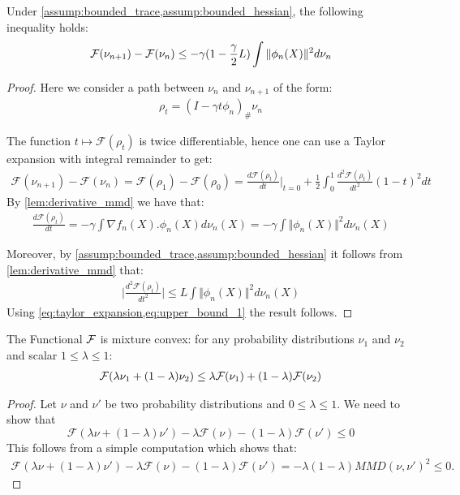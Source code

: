 \begin{lemma}\label{lem:decreasing_functional}
	Under \cref{assump:bounded_trace,assump:bounded_hessian}, the following inequality holds:
	\begin{align*}
		{{\mathcal F}}(\nu_{n+1})-{{\mathcal F}}(\nu_n)\leq -\gamma (1-\frac{\gamma}{2}L )\int \Vert \phi_n(X)\Vert^2 d\nu_n
	\end{align*}
\end{lemma}

\begin{proof}
	
Here we consider a path between $\nu_n$ and $\nu_{n+1}$ of the form:
	\begin{align*}
		\rho_t	=(I-\gamma t\phi_n)_{\#}\nu_n
\end{align*}

The function $t\mapsto \mathcal{F}(\rho_t)$ is twice differentiable, hence one can use a Taylor expansion with integral remainder to get:
\begin{align}\label{eq:taylor_expansion}
	\mathcal{F}(\nu_{n+1})-\mathcal{F}(\nu_{n})=\mathcal{F}(\rho_1)-\mathcal{F}(\rho_0) = \frac{d \mathcal{F}(\rho_t) }{dt}\vert_{t=0}+ \frac{1}{2} \int_0^1 \frac{d^2 \mathcal{F}(\rho_t)}{dt^2}(1-t)^2 dt 
\end{align} 
	By \cref{lem:derivative_mmd} we have that:
	\begin{align*}
		\frac{d \mathcal{F}(\rho_t) }{dt} = -\gamma \int \nabla f_n(X).\phi_n(X)d\nu_n(X)=-\gamma \int \Vert \phi_n(X) \Vert^2 d\nu_n(X)
	\end{align*}
	
	Moreover, by \cref{assump:bounded_trace,assump:bounded_hessian} it follows from \cref{lem:derivative_mmd} that:
	\begin{align}\label{eq:upper_bound_1}
		\vert \frac{d^2 \mathcal{F}(\rho_t) }{dt^2}   \vert\leq L\int \Vert \phi_n(X) \Vert^2 d\nu_n(X)
	\end{align}
	Using \cref{eq:taylor_expansion,eq:upper_bound_1} the result follows.
\end{proof}


\begin{lemma}\label{lem:mixture_convexity}
The Functional ${{\mathcal F}}$ is mixture convex: for any probability distributions $\nu_1$ and $\nu_2$ and scalar $1\leq \lambda\leq 1$:
\begin{align*}
	{{\mathcal F}}(\lambda \nu_1+(1-\lambda)\nu_2)\leq \lambda {{\mathcal F}}(\nu_1)+ (1-\lambda){{\mathcal F}}(\nu_2)
\end{align*}
\end{lemma}
\begin{proof}
	Let $\nu$ and $\nu'$ be two probability distributions and $0\leq \lambda\leq 1$.
	We need to show that \[\mathcal{F}(\lambda \nu + (1-\lambda)\nu') -\lambda \mathcal{F}(\nu) -(1-\lambda)\mathcal{F}(\nu')\leq 0\]
	This follows from a simple computation which shows that:
	\begin{align*}
		\mathcal{F}(\lambda \nu + (1-\lambda)\nu') -\lambda \mathcal{F}(\nu) -(1-\lambda)\mathcal{F}(\nu') = -\lambda(1-\lambda)MMD(\nu,\nu')^2 \leq 0.
	\end{align*}
\end{proof}





